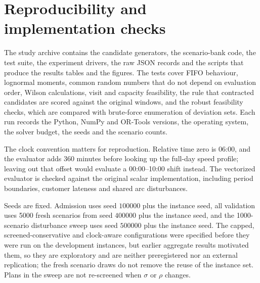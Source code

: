 \documentclass[11pt,a4paper]{article}
\begin{document}
\section{Reproducibility and implementation checks}\label{sec:reproducibility}

The study archive \cite{ali2026archive} contains the candidate generators, the
scenario-bank code, the test suite, the experiment drivers, the raw JSON records
and the scripts that produce the results tables and the figures. The tests cover
FIFO behaviour, lognormal moments, common random numbers that do not depend on
evaluation order, Wilson calculations, visit and capacity feasibility, the rule
that contracted candidates are scored against the original windows, and the
robust feasibility checks, which are compared with brute-force enumeration of
deviation sets. Each run
records the Python, NumPy and OR-Tools versions, the operating system, the solver
budget, the seeds and the scenario counts.

The clock convention matters for reproduction. Relative time zero is 06:00, and
the evaluator adds 360 minutes before looking up the full-day speed profile;
leaving out that offset would evaluate a 00:00--10:00 shift instead. The
vectorized evaluator is checked against the original scalar implementation,
including period boundaries, customer lateness and shared arc disturbances.

Seeds are fixed. Admission uses seed $100000$ plus the instance seed, all
validation uses 5000 fresh scenarios from seed $400000$ plus the instance seed,
and the 1000-scenario disturbance sweep uses seed $500000$ plus the instance
seed. The capped, screened-conservative and clock-aware configurations were specified
before they were run on the development instances, but earlier aggregate results
motivated them, so they are exploratory and are neither preregistered nor an
external replication; the fresh scenario draws do not
remove the reuse of the instance set. Plans in the sweep are not re-screened when
$\sigma$ or $\rho$ changes.
\end{document}
